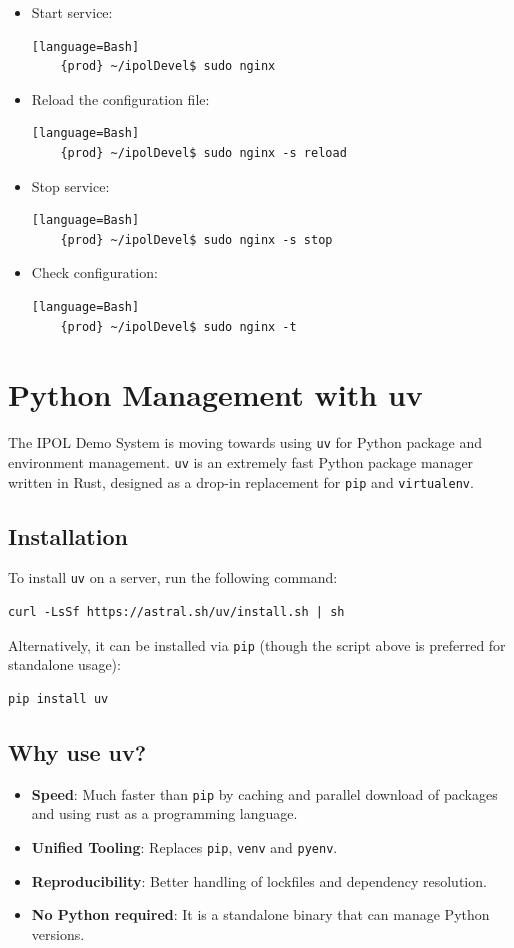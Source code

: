 \documentclass[a4paper,12pt]{article}
\begin{document}
\begin{itemize}
    \item Start service:
    \begin{verbatim}[language=Bash]
    {prod} ~/ipolDevel$ sudo nginx
    \end{verbatim}
    \item Reload the configuration file:
    \begin{verbatim}[language=Bash]
    {prod} ~/ipolDevel$ sudo nginx -s reload
    \end{verbatim}
    \item Stop service:
    \begin{verbatim}[language=Bash]
    {prod} ~/ipolDevel$ sudo nginx -s stop
    \end{verbatim}
    \item Check configuration:
    \begin{verbatim}[language=Bash]
    {prod} ~/ipolDevel$ sudo nginx -t
    \end{verbatim}
\end{itemize}



\section{Python Management with uv}
The IPOL Demo System is moving towards using \texttt{uv} for Python package and environment management. \texttt{uv} is an extremely fast Python package manager written in Rust, designed as a drop-in replacement for \texttt{pip} and \texttt{virtualenv}.

\subsection{Installation}
To install \texttt{uv} on a server, run the following command:
\begin{verbatim}
curl -LsSf https://astral.sh/uv/install.sh | sh
\end{verbatim}
Alternatively, it can be installed via \texttt{pip} (though the script above is preferred for standalone usage):
\begin{verbatim}
pip install uv
\end{verbatim}

\subsection{Why use uv?}
\begin{itemize}
    \item \textbf{Speed}: Much faster than \texttt{pip} by caching and parallel download of packages and using rust as a programming language.
    \item \textbf{Unified Tooling}: Replaces \texttt{pip}, \texttt{venv} and \texttt{pyenv}.
    \item \textbf{Reproducibility}: Better handling of lockfiles and dependency resolution.
    \item \textbf{No Python required}: It is a standalone binary that can manage Python versions.
\end{itemize}
\end{document}
